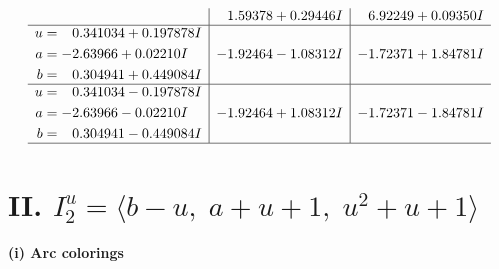 \documentclass[1p]{elsarticle_modified}
\theoremstyle{definition}
\begin{document}
$$\begin{array}{c|c|c}
 & \phantom{-}1.59378 + 0.29446 I & \phantom{-}6.92249 + 0.09350 I \\ \hline\begin{aligned}
u &= \phantom{-}0.341034 + 0.197878 I \\
a &= -2.63966 + 0.02210 I \\
b &= \phantom{-}0.304941 + 0.449084 I\end{aligned}
 & -1.92464 - 1.08312 I & -1.72371 + 1.84781 I \\ \hline\begin{aligned}
u &= \phantom{-}0.341034 - 0.197878 I \\
a &= -2.63966 - 0.02210 I \\
b &= \phantom{-}0.304941 - 0.449084 I\end{aligned}
 & -1.92464 + 1.08312 I & -1.72371 - 1.84781 I\\
 \hline 
 \end{array}$$\newpage\newpage\renewcommand{\arraystretch}{1}
\centering \section*{II. $I^u_{2}= \langle b- u,\;a+u+1,\;u^2+u+1 \rangle$}
\flushleft \textbf{(i) Arc colorings}\\
\end{document}
